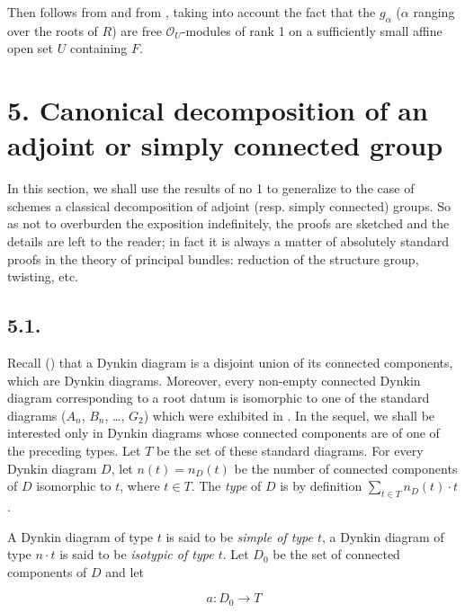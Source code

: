 Then  follows from  and from , taking into account the fact that the \(g_{\alpha}\) (\(\alpha\) ranging over the
roots of \(R\)) are free \(\mathcal O_U\)-modules of rank 1 on a sufficiently small affine open set \(U\) containing \(F\).

\section*{5. Canonical decomposition of an adjoint or simply connected group}

In this section, we shall use the results of no 1 to generalize to the case of schemes a classical decomposition of
adjoint (resp. simply connected) groups. So as not to overburden the exposition indefinitely, the proofs are sketched
and the details are left to the reader; in fact it is always a matter of absolutely standard proofs in the theory of
principal bundles: reduction of the structure group, twisting, etc.

\subsection*{5.1.}

Recall () that a Dynkin diagram is a disjoint union of its connected components, which are Dynkin diagrams.
Moreover, every non-empty connected Dynkin diagram corresponding to a root datum is isomorphic to one of the standard
diagrams (\(A_{n}\), \(B_{n}\), \ldots, \(G_2\)) which were exhibited in . In the sequel, we shall be interested
only in Dynkin diagrams whose connected components are of one of the preceding types. Let \(T\) be the set of these
standard diagrams. For every Dynkin diagram \(D\), let \(n(t) = n_{D}(t)\) be the number of connected components of \(D\)
isomorphic to \(t\), where \(t \in T\). The \emph{type} of \(D\) is by definition \(\sum_{t \in T} n_{D}(t) \cdot t\).

A Dynkin diagram of type \(t\) is said to be \emph{simple of type \(t\)}, a Dynkin diagram of type \(n \cdot t\) is said to be
\emph{isotypic of type \(t\)}. Let \(D_0\) be the set of connected components of \(D\) and let

\[ a : D_{0} \to T \]

